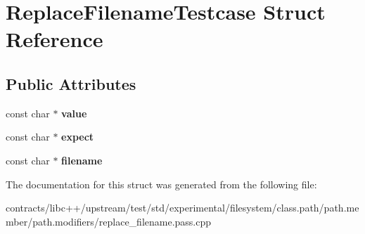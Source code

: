 \hypertarget{struct_replace_filename_testcase}{}\section{Replace\+Filename\+Testcase Struct Reference}
\label{struct_replace_filename_testcase}
\subsection*{Public Attributes}
\begin{DoxyCompactItemize}
\item 
\mbox{\label{struct_replace_filename_testcase_abe98b3bf38476fdf40c159b5d7053411}} 
const char $\ast$ {\bfseries value}
\item 
\mbox{\label{struct_replace_filename_testcase_a52c93e07ca6ea922dd447da478824593}} 
const char $\ast$ {\bfseries expect}
\item 
\mbox{\label{struct_replace_filename_testcase_ae22d5bcf60963d6dbb88ef757e55a9fd}} 
const char $\ast$ {\bfseries filename}
\end{DoxyCompactItemize}


The documentation for this struct was generated from the following file\+:\begin{DoxyCompactItemize}
\item 
contracts/libc++/upstream/test/std/experimental/filesystem/class.\+path/path.\+member/path.\+modifiers/replace\+\_\+filename.\+pass.\+cpp\end{DoxyCompactItemize}
